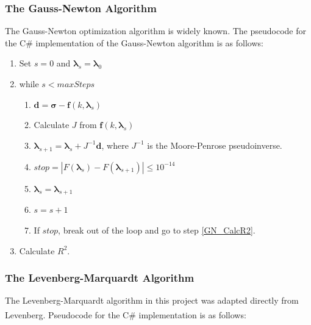 \documentclass[12pt, a4paper, notitlepage]{article}
\numberwithin{equation}{subsection}
\numberwithin{figure}{subsection}
\numberwithin{table}{subsection}
\newcommand{\lambdaVect}{\pmb{\lambda}}
\begin{document}
\subsubsection{The Gauss-Newton Algorithm}\label{subsubsec:GaussNewton}
The Gauss-Newton optimization algorithm is widely known.  The pseudocode for the C\# implementation of the Gauss-Newton algorithm is as follows:

\begin{enumerate}
	\item Set $s = 0$ and $\lambdaVect_s = \lambdaVect_0$
    \item while $s < maxSteps$
      \begin{enumerate}
          \item $\pmb{d} = \pmb{\sigma} - \pmb{f}(k,\lambdaVect_{s})$
          \item Calculate $J$ from $\pmb{f}(k,\lambdaVect_{s})$
          \item $\lambdaVect_{s+1} = \lambdaVect_{s} + J^{-1}\pmb{d}$, where $J^{-1}$ is the Moore-Penrose pseudoinverse.
          \item $stop = |F(\lambdaVect_{s}) - F(\lambdaVect_{s+1})| \leq 10^{-14}$
          \item $\lambdaVect_{s} = \lambdaVect_{s+1}$
          \item $s = s + 1$
          \item If $stop$, break out of the loop and go to step \ref{GN_CalcR2}.
      \end{enumerate}
    \item Calculate $R^2$.\label{GN_CalcR2}
\end{enumerate}

\subsubsection{The Levenberg-Marquardt Algorithm}\label{subsubsec:LevenbergMarquardt}
The Levenberg-Marquardt algorithm in this project was adapted directly from Levenberg\textsuperscript{\cite{Levenberg}}.  Pseudocode for the C\# implementation is as follows:
\end{document}

